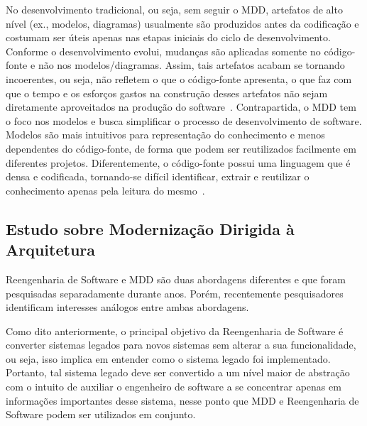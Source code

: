 No desenvolvimento tradicional, ou seja, sem seguir o MDD, artefatos de alto nível (ex., modelos, diagramas) usualmente são produzidos antes da codificação e costumam ser úteis apenas nas etapas iniciais do ciclo de desenvolvimento. Conforme o desenvolvimento evolui, mudanças são aplicadas somente no código-fonte e não nos modelos/diagramas. Assim, tais artefatos acabam se tornando incoerentes, ou seja, não refletem o que o código-fonte apresenta, o que faz com que o tempo e os esforços gastos na construção desses artefatos não sejam diretamente aproveitados na produção do software~\cite{Bittar}. Contrapartida, o MDD tem o foco nos modelos e busca simplificar o processo de desenvolvimento de software. Modelos são mais intuitivos para representação do conhecimento e menos dependentes do código-fonte, de forma que podem ser reutilizados facilmente em diferentes projetos. Diferentemente, o código-fonte possui uma linguagem que é densa e codificada, tornando-se difícil identificar, extrair e reutilizar o conhecimento apenas pela leitura do mesmo~\citep{Kleppe:2003}.




\subsection{Estudo sobre Modernização Dirigida à Arquitetura } %
\label{sub:estudo_sobre_moderniza_o_dirigida_arquitetura_}

Reengenharia de Software e MDD são duas abordagens diferentes e que foram pesquisadas separadamente durante anos. Porém, recentemente pesquisadores identificam interesses análogos entre ambas abordagens. 

Como dito anteriormente, o principal objetivo da Reengenharia de Software é converter sistemas legados para novos sistemas sem alterar a sua funcionalidade, ou seja, isso implica em entender como o sistema legado foi implementado. Portanto, tal sistema legado deve ser convertido a um nível maior de abstração com o intuito de auxiliar o engenheiro de software a se concentrar apenas em informações importantes desse sistema, nesse ponto que MDD e Reengenharia de Software podem ser utilizados em conjunto.

